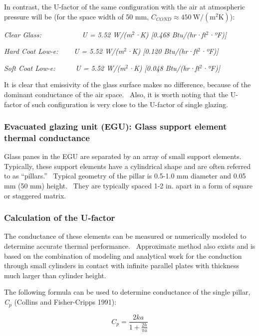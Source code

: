 In contrast, the U-factor of the same configuration with the air at atmospheric pressure will be (for the space width of 50 mm, \(C_{COND} \approx 450\ \mathrm{W/(m^2 K)}\)):

\emph{Clear Glass: ~~~~~~~~~~ U = 5.52 W/(m\(^{2}\)·K) {[}0.468 Btu/(hr·ft\(^{2}\)·ºF){]}}

\emph{Hard Coat Low-e: ~~~ U = 5.52 W/(m\(^{2}\)·K) {[}0.120 Btu/(hr·ft\(^{2}\)·ºF){]}}

\emph{Soft Coat Low-e:~~~~~ U = 5.52 W/(m\(^{2}\)·K) {[}0.048 Btu/(hr·ft\(^{2}\)·ºF){]}}

It is clear that emissivity of the glass surface makes no difference, because of the dominant conductance of the air space.~ Also, it is worth noting that the U-factor of such configuration is very close to the U-factor of single glazing.

\subsubsection{Evacuated glazing unit (EGU): Glass support element thermal conductance}\label{evacuated-glazing-unit-egu-glass-support-element-thermal-conductance}

Glass panes in the EGU are separated by an array of small support elements.~ Typically, these support elements have a cylindrical shape and are often referred to as ``pillars.''~ Typical geometry of the pillar is 0.5-1.0 mm diameter and 0.05 mm (50 mm) height.~ They are typically spaced 1-2 in. apart in a form of square or staggered matrix.

\subsubsection{Calculation of the U-factor}\label{calculation-of-the-u-factor}

The conductance of these elements can be measured or numerically modeled to determine accurate thermal performance.~ Approximate method also exists and is based on the combination of modeling and analytical work for the conduction through small cylinders in contact with infinite parallel plates with thickness much larger than cylinder height.

The following formula can be used to determine conductance of the single pillar, \emph{C}\(_{p}\) (Collins and Fisher-Cripps 1991):

\begin{equation}
{C_p} = \frac{{2ka}}{{1 + \frac{{2h}}{{\pi a}}}}
\end{equation}

